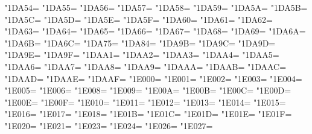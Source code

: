 \XeTeXcharclass"1DA54=\KclassCM
\XeTeXcharclass"1DA55=\KclassCM
\XeTeXcharclass"1DA56=\KclassCM
\XeTeXcharclass"1DA57=\KclassCM
\XeTeXcharclass"1DA58=\KclassCM
\XeTeXcharclass"1DA59=\KclassCM
\XeTeXcharclass"1DA5A=\KclassCM
\XeTeXcharclass"1DA5B=\KclassCM
\XeTeXcharclass"1DA5C=\KclassCM
\XeTeXcharclass"1DA5D=\KclassCM
\XeTeXcharclass"1DA5E=\KclassCM
\XeTeXcharclass"1DA5F=\KclassCM
\XeTeXcharclass"1DA60=\KclassCM
\XeTeXcharclass"1DA61=\KclassCM
\XeTeXcharclass"1DA62=\KclassCM
\XeTeXcharclass"1DA63=\KclassCM
\XeTeXcharclass"1DA64=\KclassCM
\XeTeXcharclass"1DA65=\KclassCM
\XeTeXcharclass"1DA66=\KclassCM
\XeTeXcharclass"1DA67=\KclassCM
\XeTeXcharclass"1DA68=\KclassCM
\XeTeXcharclass"1DA69=\KclassCM
\XeTeXcharclass"1DA6A=\KclassCM
\XeTeXcharclass"1DA6B=\KclassCM
\XeTeXcharclass"1DA6C=\KclassCM
\XeTeXcharclass"1DA75=\KclassCM
\XeTeXcharclass"1DA84=\KclassCM
\XeTeXcharclass"1DA9B=\KclassCM
\XeTeXcharclass"1DA9C=\KclassCM
\XeTeXcharclass"1DA9D=\KclassCM
\XeTeXcharclass"1DA9E=\KclassCM
\XeTeXcharclass"1DA9F=\KclassCM
\XeTeXcharclass"1DAA1=\KclassCM
\XeTeXcharclass"1DAA2=\KclassCM
\XeTeXcharclass"1DAA3=\KclassCM
\XeTeXcharclass"1DAA4=\KclassCM
\XeTeXcharclass"1DAA5=\KclassCM
\XeTeXcharclass"1DAA6=\KclassCM
\XeTeXcharclass"1DAA7=\KclassCM
\XeTeXcharclass"1DAA8=\KclassCM
\XeTeXcharclass"1DAA9=\KclassCM
\XeTeXcharclass"1DAAA=\KclassCM
\XeTeXcharclass"1DAAB=\KclassCM
\XeTeXcharclass"1DAAC=\KclassCM
\XeTeXcharclass"1DAAD=\KclassCM
\XeTeXcharclass"1DAAE=\KclassCM
\XeTeXcharclass"1DAAF=\KclassCM
\XeTeXcharclass"1E000=\KclassCM
\XeTeXcharclass"1E001=\KclassCM
\XeTeXcharclass"1E002=\KclassCM
\XeTeXcharclass"1E003=\KclassCM
\XeTeXcharclass"1E004=\KclassCM
\XeTeXcharclass"1E005=\KclassCM
\XeTeXcharclass"1E006=\KclassCM
\XeTeXcharclass"1E008=\KclassCM
\XeTeXcharclass"1E009=\KclassCM
\XeTeXcharclass"1E00A=\KclassCM
\XeTeXcharclass"1E00B=\KclassCM
\XeTeXcharclass"1E00C=\KclassCM
\XeTeXcharclass"1E00D=\KclassCM
\XeTeXcharclass"1E00E=\KclassCM
\XeTeXcharclass"1E00F=\KclassCM
\XeTeXcharclass"1E010=\KclassCM
\XeTeXcharclass"1E011=\KclassCM
\XeTeXcharclass"1E012=\KclassCM
\XeTeXcharclass"1E013=\KclassCM
\XeTeXcharclass"1E014=\KclassCM
\XeTeXcharclass"1E015=\KclassCM
\XeTeXcharclass"1E016=\KclassCM
\XeTeXcharclass"1E017=\KclassCM
\XeTeXcharclass"1E018=\KclassCM
\XeTeXcharclass"1E01B=\KclassCM
\XeTeXcharclass"1E01C=\KclassCM
\XeTeXcharclass"1E01D=\KclassCM
\XeTeXcharclass"1E01E=\KclassCM
\XeTeXcharclass"1E01F=\KclassCM
\XeTeXcharclass"1E020=\KclassCM
\XeTeXcharclass"1E021=\KclassCM
\XeTeXcharclass"1E023=\KclassCM
\XeTeXcharclass"1E024=\KclassCM
\XeTeXcharclass"1E026=\KclassCM
\XeTeXcharclass"1E027=\KclassCM
